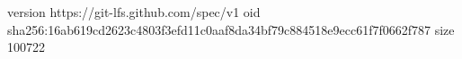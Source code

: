 version https://git-lfs.github.com/spec/v1
oid sha256:16ab619cd2623c4803f3efd11c0aaf8da34bf79c884518e9ecc61f7f0662f787
size 100722
